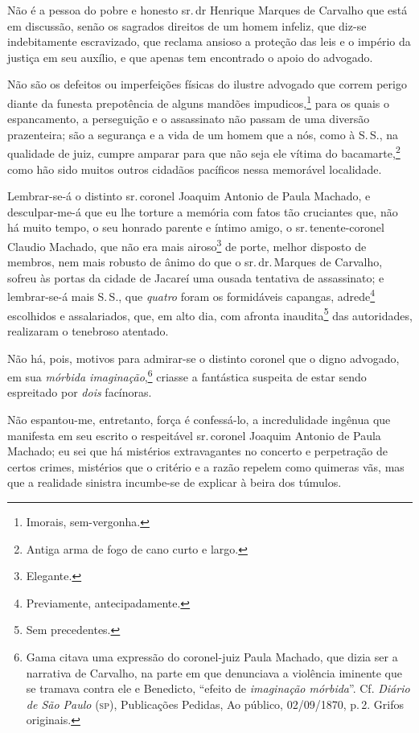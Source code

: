 Não é a pessoa do pobre e honesto sr.\,dr Henrique Marques de Carvalho
que está em discussão, senão os sagrados direitos de um homem infeliz,
que diz-se indebitamente escravizado, que reclama ansioso a proteção das
leis e o império da justiça em seu auxílio, e que apenas tem encontrado
o apoio do advogado.

Não são os defeitos ou imperfeições físicas do ilustre advogado que
correm perigo diante da funesta prepotência de alguns mandões
impudicos,\footnote{ Imorais, sem-vergonha.} para os quais o
espancamento, a perseguição e o assassinato não passam de uma diversão
prazenteira; são a segurança e a vida de um homem que a nós, como à S.\,S., na qualidade de juiz, cumpre amparar para que não seja ele vítima do
bacamarte,\footnote{ Antiga arma de fogo de cano curto e largo.} como
hão sido muitos outros cidadãos pacíficos nessa memorável localidade.

Lembrar-se-á o distinto sr.\,coronel Joaquim Antonio de Paula Machado, e
desculpar-me-á que eu lhe torture a memória com fatos tão cruciantes
que, não há muito tempo, o seu honrado parente e íntimo amigo, o sr.\,tenente-coronel Claudio Machado, que não era mais airoso\footnote{
  Elegante.} de porte, melhor disposto de membros, nem mais robusto de
ânimo do que o sr.\,dr.\,Marques de Carvalho, sofreu às portas da cidade
de Jacareí uma ousada tentativa de assassinato; e lembrar-se-á mais S.\,S., que \emph{quatro} foram os formidáveis capangas, adrede\footnote{
  Previamente, antecipadamente.} escolhidos e assalariados, que, em alto
dia, com afronta inaudita\footnote{ Sem precedentes.} das autoridades,
realizaram o tenebroso atentado.

Não há, pois, motivos para admirar-se o distinto coronel que o digno
advogado, em sua \emph{mórbida imaginação},\footnote{ Gama citava uma
  expressão do coronel-juiz Paula Machado, que dizia ser a narrativa de
  Carvalho, na parte em que denunciava a violência iminente que se
  tramava contra ele e Benedicto, ``efeito de \emph{imaginação mórbida}''.
  Cf. \emph{Diário de São Paulo} (\textsc{sp}), Publicações Pedidas, Ao público,
  02/09/1870, p.\,2. Grifos originais.} criasse a fantástica suspeita de
estar sendo espreitado por \emph{dois} facínoras.

Não espantou-me, entretanto, força é confessá-lo, a incredulidade
ingênua que manifesta em seu escrito o respeitável sr.\,coronel Joaquim
Antonio de Paula Machado; eu sei que há mistérios extravagantes no
concerto e perpetração de certos crimes, mistérios que o critério e a
razão repelem como quimeras vãs, mas que a realidade sinistra incumbe-se
de explicar à beira dos túmulos.

